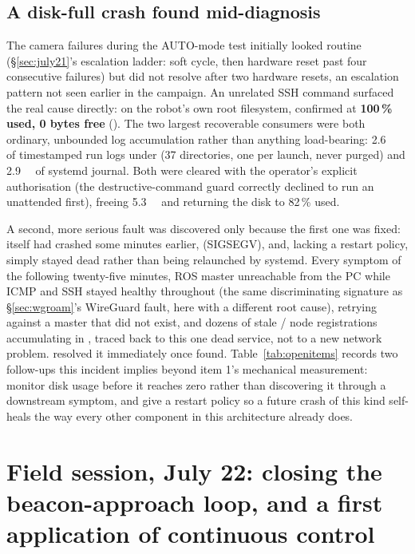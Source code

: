 \subsection{A disk-full crash found mid-diagnosis}
\label{sec:diskcrash}
The camera failures during the AUTO-mode test initially looked routine
(\S\ref{sec:july21}'s escalation ladder: soft cycle, then hardware reset
past four consecutive failures) but did not resolve after two hardware
resets, an escalation pattern not seen earlier in the campaign. An
unrelated SSH command surfaced the real cause directly:  on the robot's own root filesystem, confirmed at
\textbf{100\,\% used, 0 bytes free} (). The two largest
recoverable consumers were both ordinary, unbounded log accumulation
rather than anything load-bearing: \SI{2.6}{\giga\byte} of timestamped
 run logs under  (37 directories, one
per launch, never purged) and \SI{2.9}{\giga\byte} of systemd journal.
Both were cleared with the operator's explicit authorisation (the
destructive-command guard correctly declined to run an unattended
 first), freeing \SI{5.3}{\giga\byte} and returning the disk
to 82\,\% used.

A second, more serious fault was discovered only because the first one
was fixed:  itself had crashed some minutes earlier,
 (SIGSEGV), and, lacking a restart policy, simply
stayed dead rather than being relaunched by systemd. Every symptom of the
following twenty-five minutes, ROS master unreachable from the PC while
ICMP and SSH stayed healthy throughout (the same discriminating signature
as \S\ref{sec:wgroam}'s WireGuard fault, here with a different root
cause),  retrying against a master that did not
exist, and dozens of stale / node
registrations accumulating in , traced back to this one
dead service, not to a new network problem.  resolved it immediately once found. Table~\ref{tab:openitems} records
two follow-ups this incident implies beyond item 1's mechanical
measurement: monitor disk usage before it reaches zero rather than
discovering it through a downstream symptom, and give 
a restart policy so a future crash of this kind self-heals the way every
other component in this architecture already does.

\section{Field session, July 22: closing the beacon-approach loop, and a first application of continuous control}
\label{sec:july22}

